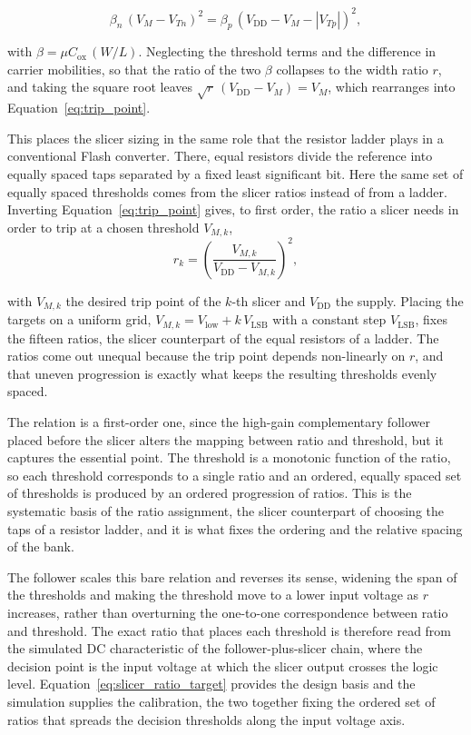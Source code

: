 \[
\beta_n\,(V_M - V_{Tn})^2 = \beta_p\,(V_\mathrm{DD} - V_M - |V_{Tp}|)^2,
\]

with $\beta = \mu C_\mathrm{ox}\,(W/L)$. Neglecting the threshold terms and the difference in carrier mobilities, so that the ratio of the two $\beta$ collapses to the width ratio $r$, and taking the square root leaves $\sqrt{r}\,(V_\mathrm{DD}-V_M) = V_M$, which rearranges into Equation~\eqref{eq:trip_point}.

This places the slicer sizing in the same role that the resistor ladder plays in a conventional Flash converter. There, equal resistors divide the reference into equally spaced taps separated by a fixed least significant bit. Here the same set of equally spaced thresholds comes from the slicer ratios instead of from a ladder. Inverting Equation~\eqref{eq:trip_point} gives, to first order, the ratio a slicer needs in order to trip at a chosen threshold $V_{M,k}$,
\begin{equation}
    r_k = \left(\frac{V_{M,k}}{V_\mathrm{DD} - V_{M,k}}\right)^{2},
    \label{eq:slicer_ratio_target}
\end{equation}

\noindent
with $V_{M,k}$ the desired trip point of the $k$-th slicer and $V_\mathrm{DD}$ the supply. Placing the targets on a uniform grid, $V_{M,k} = V_\mathrm{low} + k\,V_\mathrm{LSB}$ with a constant step $V_\mathrm{LSB}$, fixes the fifteen ratios, the slicer counterpart of the equal resistors of a ladder. The ratios come out unequal because the trip point depends non-linearly on $r$, and that uneven progression is exactly what keeps the resulting thresholds evenly spaced.

The relation is a first-order one, since the high-gain complementary follower placed before the slicer alters the mapping between ratio and threshold, but it captures the essential point. The threshold is a monotonic function of the ratio, so each threshold corresponds to a single ratio and an ordered, equally spaced set of thresholds is produced by an ordered progression of ratios. This is the systematic basis of the ratio assignment, the slicer counterpart of choosing the taps of a resistor ladder, and it is what fixes the ordering and the relative spacing of the bank.

The follower scales this bare relation and reverses its sense, widening the span of the thresholds and making the threshold move to a lower input voltage as $r$ increases, rather than overturning the one-to-one correspondence between ratio and threshold. The exact ratio that places each threshold is therefore read from the simulated DC characteristic of the follower-plus-slicer chain, where the decision point is the input voltage at which the slicer output crosses the logic level. Equation~\eqref{eq:slicer_ratio_target} provides the design basis and the simulation supplies the calibration, the two together fixing the ordered set of ratios that spreads the decision thresholds along the input voltage axis.

